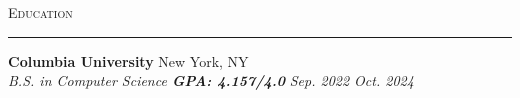 \documentclass[11pt,letterpaper]{article}
\begin{document}
\medskip
\textsc{\large{Education}}
\smallskip
\hrule
\begin{list}{}{\setlength{\leftmargin}{1em}}
    \item
          

        
            \textbf{Columbia University} \hfill  {New York, NY}\\
            \small{\textit{B.S. in Computer Science \textbf{GPA: 4.157/4.0}}} \hfill {\textit{Sep. 2022 \textendash Oct. 2024}}
\end{list}

\end{document}
